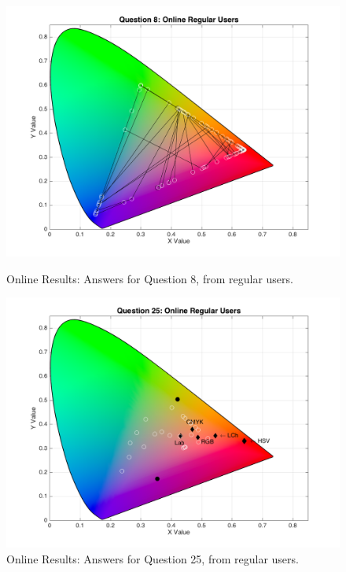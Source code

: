 \begin{figure}[!htbp]
  \centering
  \begin{minipage}{0.48\textwidth}
    \centering
    \includegraphics[width=\textwidth]{images/results/8_online_regularUsers.png}
    \caption[Online Results: Answers for Question 8, from regular users.]{Online Results: Answers for Question 8, from regular users.}
    \label{fig:redblend_1}
  \end{minipage}\hfill
  \begin{minipage}{0.48\textwidth}
    \centering
    \includegraphics[width=\textwidth]{images/results/25_online_regularUsers.png}
    \caption[Online Results: Answers for Question 25, from regular users.]{Online Results: Answers for Question 25, from regular users.}
    \label{fig:redblend_2}
  \end{minipage}
\end{figure}
%

